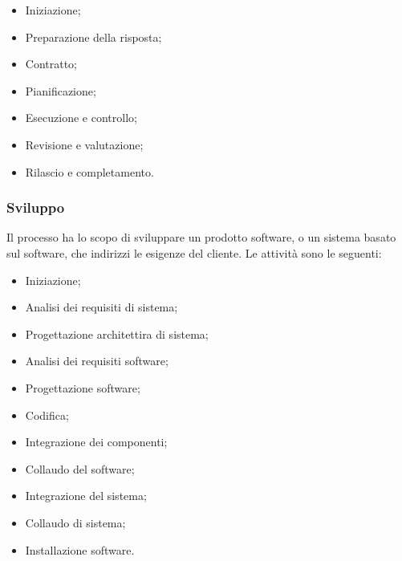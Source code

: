 \begin{itemize}

\item Iniziazione;

\item Preparazione della risposta;

\item Contratto;

\item Pianificazione;

\item Esecuzione e controllo;

\item Revisione e valutazione;

\item Rilascio e completamento.

\end{itemize}

\subsubsection{Sviluppo}
Il processo ha lo scopo di sviluppare un prodotto software, o un sistema basato sul software, che indirizzi le esigenze del cliente.
Le attività sono le seguenti:

\begin{itemize}

\item Iniziazione;

\item Analisi dei requisiti di sistema;

\item Progettazione architettira di sistema;

\item Analisi dei requisiti software;

\item Progettazione software;

\item Codifica;

\item Integrazione dei componenti;

\item Collaudo del software;

\item Integrazione del sistema;

\item Collaudo di sistema;

\item Installazione software.

\end{itemize}

